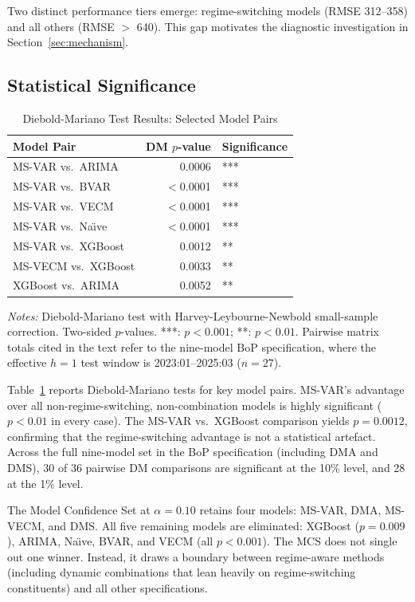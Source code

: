 \documentclass[12pt,a4paper]{article}
\begin{document}
Two distinct performance tiers emerge: regime-switching models (RMSE 312--358) and all others (RMSE $>$ 640). This gap motivates the diagnostic investigation in Section~\ref{sec:mechanism}.

\subsection{Statistical Significance}
\label{sec:stat_tests}

\begin{table}[htbp]
\centering
\caption{Diebold-Mariano Test Results: Selected Model Pairs}
\label{tab:dm_tests}
\begin{tabular}{lrl}
\toprule
Model Pair & DM $p$-value & Significance \\
\midrule
MS-VAR vs.\ ARIMA & 0.0006 & *** \\
MS-VAR vs.\ BVAR & $<$0.0001 & *** \\
MS-VAR vs.\ VECM & $<$0.0001 & *** \\
MS-VAR vs.\ Na\"{\i}ve & $<$0.0001 & *** \\
MS-VAR vs.\ XGBoost & 0.0012 & ** \\
MS-VECM vs.\ XGBoost & 0.0033 & ** \\
XGBoost vs.\ ARIMA & 0.0052 & ** \\
\bottomrule
\end{tabular}
\begin{tablenotes}
\small
\item \textit{Notes:} Diebold-Mariano test with Harvey-Leybourne-Newbold small-sample correction. Two-sided $p$-values. ***: $p < 0.001$; **: $p < 0.01$. Pairwise matrix totals cited in the text refer to the nine-model BoP specification, where the effective $h=1$ test window is 2023:01--2025:03 ($n=27$).
\end{tablenotes}
\end{table}

Table~\ref{tab:dm_tests} reports Diebold-Mariano tests for key model pairs. MS-VAR's advantage over all non-regime-switching, non-combination models is highly significant ($p < 0.01$ in every case). The MS-VAR vs.\ XGBoost comparison yields $p = 0.0012$, confirming that the regime-switching advantage is not a statistical artefact. Across the full nine-model set in the BoP specification (including DMA and DMS), 30 of 36 pairwise DM comparisons are significant at the 10\% level, and 28 at the 1\% level.

The Model Confidence Set at $\alpha = 0.10$ retains four models: MS-VAR, DMA, MS-VECM, and DMS. All five remaining models are eliminated: XGBoost ($p = 0.009$), ARIMA, Na\"{\i}ve, BVAR, and VECM (all $p < 0.001$). The MCS does not single out one winner. Instead, it draws a boundary between regime-aware methods (including dynamic combinations that lean heavily on regime-switching constituents) and all other specifications.
\end{document}
